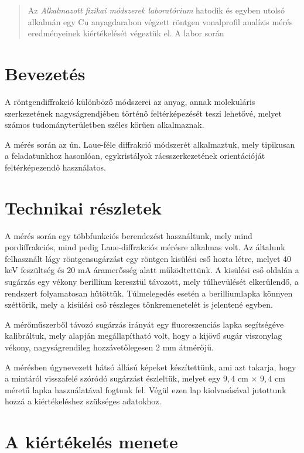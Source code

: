 \begin{abstract}
    \noindent Az \emph{Alkalmazott fizikai módszerek laboratórium} hatodik és egyben utolsó alkalmán egy Cu anyagdarabon végzett röntgen vonalprofil analízis mérés eredményeinek kiértékelését végeztük el. A labor során 
\end{abstract}

\begin{multicols}{2}
\section{Bevezetés}
A röntgendiffrakció különböző módszerei az anyag, annak molekuláris szerkezetének nagyságrendjében történő feltérképezését teszi lehetővé, melyet számos tudományterületben széles körűen alkalmaznak. \par
A mérés során az ún. Laue-féle diffrakció módszerét alkalmaztuk, mely tipikusan a feladatunkhoz hasonlóan, egykristályok rácsszerkezetének orientációját feltérképezendő használatos.

\section{Technikai részletek}
A mérés során egy többfunkciós berendezést használtunk, mely mind pordiffrakciós, mind pedig Laue-diffrakciós mérésre alkalmas volt. Az általunk felhasznált lágy röntgensugárzást egy röntgen kisülési cső hozta létre, melyet $40$ keV feszültség és $20$ mA áramerősség alatt működtettünk. A kisülési cső oldalán a sugárzás egy vékony berillium  keresztül távozott, mely túlhevülését elkerülendő, a rendszert folyamatosan hűtöttük. Túlmelegedés esetén a berilliumlapka könnyen széttörik, mely a kisülési cső részleges tönkremenetelét is jelentené egyben. \par
A mérőműszerből távozó sugárzás irányát egy fluoreszenciás lapka segítségéve kalibráltuk, mely alapján megállapítható volt, hogy a kijövő sugár viszonylag vékony, nagyságrendileg hozzávetőlegesen 2 mm átmérőjű. \par
A mérésben úgynevezett hátsó állású képeket készítettünk, ami azt takarja, hogy a mintáról visszafelé szóródó sugárzást észleltük, melyet egy $9,4$ cm $\times$ $9,4$ cm méretű  lapka használatával fogtunk fel. Végül ezen lap kiolvasásával jutottunk hozzá a kiértékeléshez szükséges adatokhoz.

\section{A kiértékelés menete}

\end{multicols}
